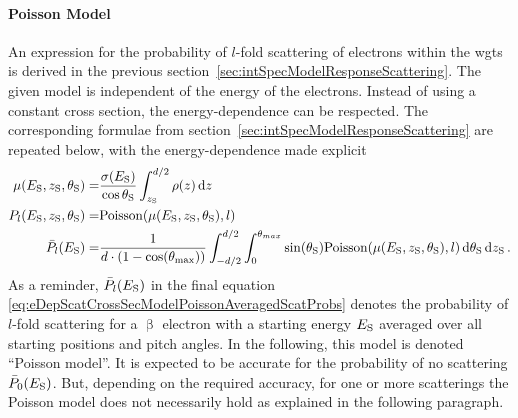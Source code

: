 \paragraph{Poisson Model}
An expression for the probability of $l$-fold scattering of electrons within the \gls{wgts} is derived in the previous section~\ref{sec:intSpecModelResponseScattering}. The given model is independent of the energy of the electrons. Instead of using a constant cross section, the energy-dependence can be respected. The corresponding formulae from section~\ref{sec:intSpecModelResponseScattering} are repeated below, with the energy-dependence made explicit
\begin{subequations}
\label{eq:eDepScatCrossSecModelPoisson}
\begin{align}
    \mu(E_\mathrm{S},z_\mathrm{S},\theta_\mathrm{S}) =&
    \frac{\sigma(E_\mathrm{S})}{\cos\theta_\mathrm{S}}
    \int_{z_\mathrm{S}}^{d/2} \rho(z)\mathop{}\!\mathrm{d} z \label{eq:energydepScatProbsPoissonExpectedScatCount} \\
    P_l(E_\mathrm{S},z_\mathrm{S},\theta_\mathrm{S}) =&
    \mathrm{Poisson}(\mu(E_\mathrm{S},z_\mathrm{S},\theta_\mathrm{S}),l) \label{eq:eDepScatCrossSecModelPoissonNonAveragedScatProbs} \\
    \bar{P}_l(E_\mathrm{S}) =&
    \frac{1}{d \cdot (1-\cos(\theta_\mathrm{max}))} 
      \int_{-d/2}^{d/2}  
          \int_{0}^{\theta_{max}} 
            \sin(\theta_\mathrm{S})
            \mathrm{Poisson}(\mu(E_\mathrm{S},z_\mathrm{S},\theta_\mathrm{S}),l)
          \mathop{}\!\mathrm{d}\theta_\mathrm{S}
      \mathop{}\!\mathrm{d}z_\mathrm{S}
      \label{eq:eDepScatCrossSecModelPoissonAveragedScatProbs}
    \text{\,.}
\end{align}
\end{subequations}
As a reminder, $\bar{P}_l(E_\mathrm{S})$ in the final equation \eqref{eq:eDepScatCrossSecModelPoissonAveragedScatProbs} denotes the probability of $l$-fold scattering for a $\upbeta$ electron with a starting energy $E_\mathrm{S}$ averaged over all starting positions and pitch angles. In the following, this model is denoted ``Poisson model''. It is expected to be accurate for the probability of no scattering $\bar{P}_0(E_\mathrm{S})$. But, depending on the required accuracy, for one or more scatterings the Poisson model does not necessarily hold as explained in the following paragraph.

